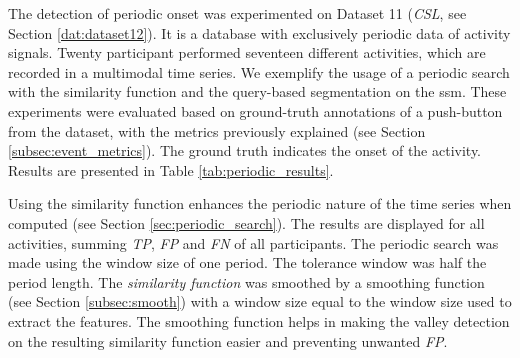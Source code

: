 The detection of periodic onset was experimented on Dataset 11 (\textit{CSL}, see Section \ref{dat:dataset12}). It is a database with exclusively periodic data of activity signals. Twenty participant performed seventeen different activities, which are recorded in a multimodal time series. We exemplify the usage of a periodic search with the similarity function and the query-based segmentation on the \gls{ssm}. These experiments were evaluated based on ground-truth annotations of a push-button from the dataset, with the metrics previously explained (see Section \ref{subsec:event_metrics}). The ground truth indicates the onset of the activity. Results are presented in Table \ref{tab:periodic_results}.

Using the similarity function enhances the periodic nature of the time series when computed (see Section \ref{sec:periodic_search}). The results are displayed for all activities, summing \textit{TP}, \textit{FP} and \textit{FN} of all participants. The periodic search was made using the window size of one period. The tolerance window was half the period length. The \textit{similarity function} was smoothed by a smoothing function (see Section \ref{subsec:smooth}) with a window size equal to the window size used to extract the features. The smoothing function helps in making the valley detection on the resulting similarity function easier and preventing unwanted \textit{FP}.

